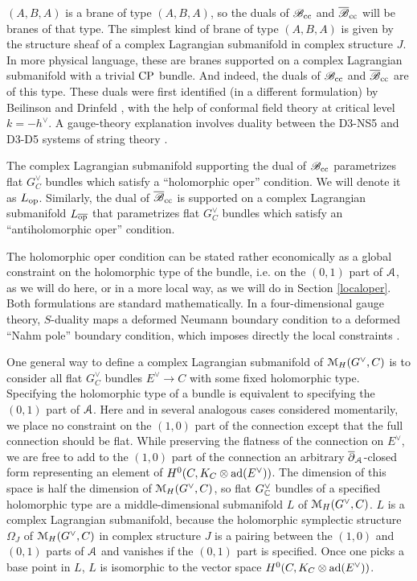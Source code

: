 \documentclass[11pt,a4paper]{article}
\begin{document}
$(A,B,A)$ is a brane of type $(A,B,A)$, so the duals of ${\mathscr B}_{\mathrm{cc}}$ and ${\overline {\mathscr B}}_{\mathrm{cc}}$ will be branes of that type.   The simplest kind of brane of type $(A,B,A)$
is given by the structure sheaf of a complex Lagrangian submanifold in complex structure $J$.   In more physical language, these are branes supported
on a complex Lagrangian submanifold with a trivial ${\mathrm{CP}}$ bundle. And indeed, the duals of ${\mathscr B}_{\mathrm{cc}}$ and ${\overline {\mathscr B}}_{\mathrm{cc}}$ are  of this type. These duals 
were first identified (in a different formulation) by Beilinson and Drinfeld \cite{BD}, with the help of conformal field theory at critical level $k=-h^\vee$.  
A gauge-theory explanation involves duality between  the D3-NS5  and  D3-D5 systems of string theory \cite{GWknots}.  

The complex Lagrangian submanifold supporting the dual of ${\mathscr B}_{\mathrm{cc}}$ parametrizes flat $G^\vee_C$ bundles which satisfy a ``holomorphic oper'' 
condition. We will denote it as $L_{\mathrm{op}}$. Similarly, the dual of ${\overline {\mathscr B}}_{\mathrm{cc}}$ is supported on a complex Lagrangian submanifold $L_{\overline{\mathrm{op}}}$  that parametrizes
flat $G^\vee_C$ bundles which satisfy an ``antiholomorphic oper'' condition. 

The holomorphic oper condition can be stated rather economically as a global constraint on the holomorphic type of the bundle, i.e. on the $(0,1)$ part of ${\mathcal A}$,
as we will do here, or in a more local way, as we will do in Section \ref{localoper}.   Both formulations are standard mathematically.
In a four-dimensional gauge theory, $S$-duality maps a deformed Neumann boundary condition to a deformed ``Nahm pole'' boundary condition, 
which  imposes directly the local constraints \cite{GWknots}. 

One general way to define a complex Lagrangian submanifold of ${\mathcal M}_H(G^\vee,C)$ is to consider all flat 
$G^\vee_C$ bundles $E^\vee\to C$ with some fixed holomorphic type.  Specifying the holomorphic type of a bundle is 
equivalent to specifying the $(0,1)$ part of ${\mathcal A}$.   Here and in several
analogous cases considered momentarily, we  place no constraint
on the $(1,0)$ part of the connection except that the full connection should be flat.  While preserving the flatness of the connection on $E^\vee$,
we are free to add to the $(1,0)$ part of the connection an arbitrary $\overline\partial_{\mathcal A}$-closed form representing an
element of $H^0(C,K_C\otimes {\mathrm{ad}}(E^\vee))$.    The dimension of this space is half the dimension of ${\mathcal M}_H(G^\vee,C)$, so flat $G^\vee_{\mathbb C}$
bundles 
of a specified holomorphic type are a middle-dimensional submanifold $L$ of ${\mathcal M}_H(G^\vee,C)$.   $L$ is  a complex Lagrangian submanifold, because
the holomorphic symplectic structure $\Omega_J$ of ${\mathcal M}_H(G^\vee,C)$ in complex structure $J$ is a pairing between the $(1,0)$ and $(0,1)$ parts of ${\mathcal A}$
and vanishes if the $(0,1)$ part is specified.  Once one picks a base point in $L$, $L$ is isomorphic to the vector space $H^0(C,K_C\otimes {\mathrm{ad}}(E^\vee))$.
 
\end{document}
